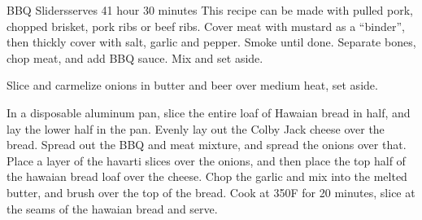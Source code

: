 \begin{recipe}{BBQ Sliders}{serves 4}{1 hour 30 minutes}
  This recipe can be made with pulled pork, chopped brisket, pork ribs or beef ribs.  Cover meat with mustard as a ``binder'', then thickly cover with salt, garlic and pepper.  Smoke until done.  Separate bones, chop meat, and add BBQ sauce.  Mix and set aside.


 Slice and carmelize onions in butter and beer over medium heat, set aside.


  In a disposable aluminum pan, slice the entire loaf of Hawaian bread in half, and lay the lower half in the pan.  Evenly lay out the Colby Jack cheese over the bread.  Spread out the BBQ and meat mixture, and spread the onions over that.  Place a layer of the havarti slices over the onions, and then place the top half of the hawaian bread loaf over the cheese.  Chop the garlic and mix into the melted butter, and brush over the top of the bread.  Cook at 350F for 20 minutes, slice at the seams of the hawaian bread and serve.

\end{recipe}
